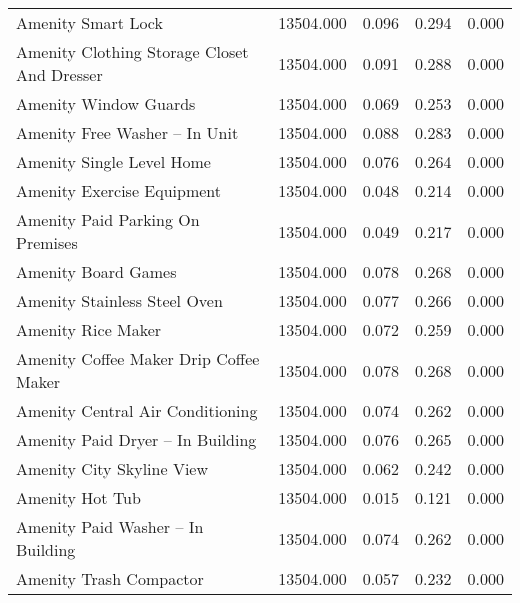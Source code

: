 \begin{tabular}{lllll}
Amenity Smart Lock & 13504.000 & 0.096 & 0.294 & 0.000 \\
Amenity Clothing Storage Closet And Dresser & 13504.000 & 0.091 & 0.288 & 0.000 \\
Amenity Window Guards & 13504.000 & 0.069 & 0.253 & 0.000 \\
Amenity Free Washer – In Unit & 13504.000 & 0.088 & 0.283 & 0.000 \\
Amenity Single Level Home & 13504.000 & 0.076 & 0.264 & 0.000 \\
Amenity Exercise Equipment & 13504.000 & 0.048 & 0.214 & 0.000 \\
Amenity Paid Parking On Premises & 13504.000 & 0.049 & 0.217 & 0.000 \\
Amenity Board Games & 13504.000 & 0.078 & 0.268 & 0.000 \\
Amenity Stainless Steel Oven & 13504.000 & 0.077 & 0.266 & 0.000 \\
Amenity Rice Maker & 13504.000 & 0.072 & 0.259 & 0.000 \\
Amenity Coffee Maker Drip Coffee Maker & 13504.000 & 0.078 & 0.268 & 0.000 \\
Amenity Central Air Conditioning & 13504.000 & 0.074 & 0.262 & 0.000 \\
Amenity Paid Dryer – In Building & 13504.000 & 0.076 & 0.265 & 0.000 \\
Amenity City Skyline View & 13504.000 & 0.062 & 0.242 & 0.000 \\
Amenity Hot Tub & 13504.000 & 0.015 & 0.121 & 0.000 \\
Amenity Paid Washer – In Building & 13504.000 & 0.074 & 0.262 & 0.000 \\
Amenity Trash Compactor & 13504.000 & 0.057 & 0.232 & 0.000 \\
\bottomrule
\end{tabular}

